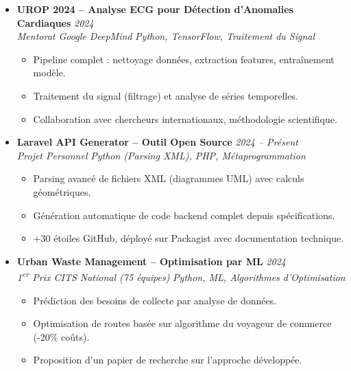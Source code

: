 \documentclass[a4paper,11pt]{article}
\begin{document}
\begin{itemize}[leftmargin=*, label={-}]
\item \textbf{UROP 2024 -- Analyse ECG pour Détection d'Anomalies Cardiaques} \hfill \textit{2024} \\
\textit{Mentorat Google DeepMind} \hfill \textit{Python, TensorFlow, Traitement du Signal}
\vspace{-2pt}
    \begin{itemize}[leftmargin=0.4cm, nosep, label=\tiny$\bullet$]
        \item \small{Pipeline complet : nettoyage données, extraction features, entraînement modèle.}
        \item \small{Traitement du signal (filtrage) et analyse de séries temporelles.}
        \item \small{Collaboration avec chercheurs internationaux, méthodologie scientifique.}
    \end{itemize}
\vspace{3pt}

\item \textbf{Laravel API Generator -- Outil Open Source} \hfill \textit{2024 -- Présent} \\
\textit{Projet Personnel} \hfill \textit{Python (Parsing XML), PHP, Métaprogrammation}
\vspace{-2pt}
    \begin{itemize}[leftmargin=0.4cm, nosep, label=\tiny$\bullet$]
        \item \small{Parsing avancé de fichiers XML (diagrammes UML) avec calculs géométriques.}
        \item \small{Génération automatique de code backend complet depuis spécifications.}
        \item \small{+30 étoiles GitHub, déployé sur Packagist avec documentation technique.}
    \end{itemize}
\vspace{3pt}

\item \textbf{Urban Waste Management -- Optimisation par ML} \hfill \textit{2024} \\
\textit{1\textsuperscript{er} Prix CITS National (75 équipes)} \hfill \textit{Python, ML, Algorithmes d'Optimisation}
\vspace{-2pt}
    \begin{itemize}[leftmargin=0.4cm, nosep, label=\tiny$\bullet$]
        \item \small{Prédiction des besoins de collecte par analyse de données.}
        \item \small{Optimisation de routes basée sur algorithme du voyageur de commerce (-20\% coûts).}
        \item \small{Proposition d'un papier de recherche sur l'approche développée.}
    \end{itemize}
\vspace{3pt}


\end{itemize}
\end{document}
